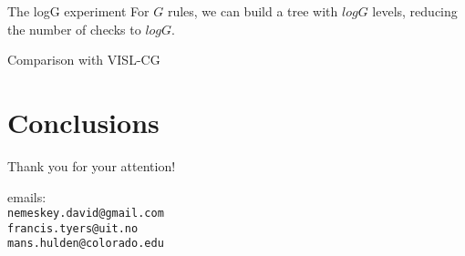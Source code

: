 \documentclass[utf8x,t,aspectratio=169]{beamer}
\begin{document}
\begin{frame}{The logG experiment}
For $G$ rules, we can build a tree with $logG$ levels, reducing the number of
checks to $logG$.
\end{frame}

\begin{frame}{Comparison with VISL-CG}
\end{frame}

\section{Conclusions}



\begin{frame}

\bigskip

\bigskip

{\huge Thank you for your attention!}

\bigskip
\bigskip
\bigskip

emails: \\ {\tt nemeskey.david@gmail.com \\ francis.tyers@uit.no \\ mans.hulden@colorado.edu} \\

\end{frame}
\end{document}
